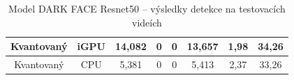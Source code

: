\begin{table}[H]
\begin{tabular}{cc|ccc|ccc|}
  \multicolumn{1}{|c|}{\cellcolor[HTML]{E0DBDB}Kvantovaný}     & \cellcolor[HTML]{E0DBDB}iGPU & \multicolumn{1}{c|}{14,082}                                 & \multicolumn{1}{c|}{0}                                      & 0              & \multicolumn{1}{c|}{13,657}                                 & \multicolumn{1}{c|}{1,98}                                   & 34,26          \\ \hline
  \multicolumn{1}{|c|}{\cellcolor[HTML]{E0DBDB}Kvantovaný}     & \cellcolor[HTML]{E0DBDB}CPU  & \multicolumn{1}{c|}{5,381}                                  & \multicolumn{1}{c|}{0}                                      & 0              & \multicolumn{1}{c|}{5,413}                                  & \multicolumn{1}{c|}{2,37}                                   & 33,26          \\ \hline
  \end{tabular}
  \label{tabulka:dfrvidea}
  \caption{Model DARK FACE Resnet50 -- výsledky detekce na testovacích videích}
\end{table}


